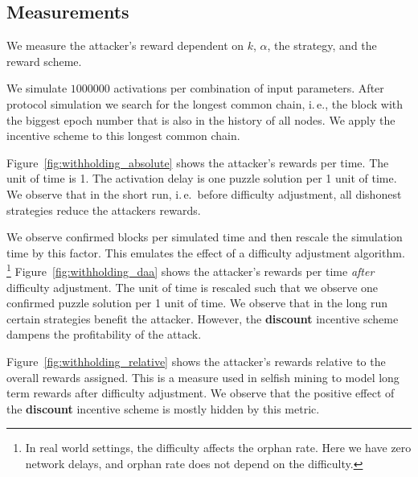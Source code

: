 \documentclass{article}
\begin{document}
\subsection{Measurements}

We measure the attacker's reward dependent on $k$, $\alpha$, the strategy, and the reward scheme.

We simulate $1 000 000$ activations per combination of input parameters.
After protocol simulation we search for the longest common chain, i.\,e., the block with the biggest epoch number that is also in the history of all nodes.
We apply the incentive scheme to this longest common chain.

Figure~\ref{fig:withholding_absolute} shows the attacker's rewards per time. The unit of time is 1. The activation delay is one puzzle solution per 1 unit of time. We observe that in the short run, i.\,e.\ before difficulty adjustment, all dishonest strategies reduce the attackers rewards.

We observe confirmed blocks per simulated time and then rescale the simulation time by this factor.
This emulates the effect of a difficulty adjustment algorithm.%
\footnote{In real world settings, the difficulty affects the orphan rate. Here we have zero network delays, and orphan rate does not depend on the difficulty.}
Figure~\ref{fig:withholding_daa} shows the attacker's rewards per time \emph{after} difficulty adjustment.
The unit of time is rescaled such that we observe one confirmed puzzle solution per 1 unit of time.
We observe that in the long run certain strategies benefit the attacker.
However, the \textbf{discount} incentive scheme dampens the profitability of the attack.

Figure~\ref{fig:withholding_relative} shows the attacker's rewards relative to the overall rewards assigned.
This is a measure used in selfish mining to model long term rewards after difficulty adjustment.
We observe that the positive effect of the \textbf{discount} incentive scheme is mostly hidden by this metric.
\end{document}
